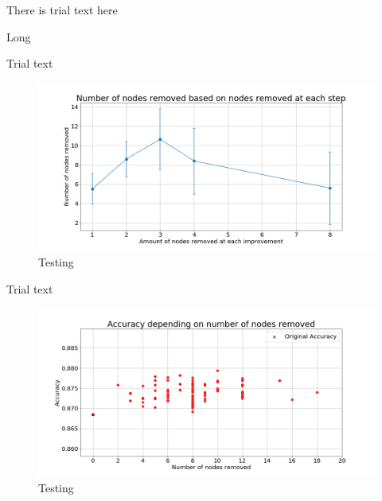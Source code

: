 \documentclass[UKenglish]{ifimaster}
\begin{document}
            There is trial text here

            \begin{table}[h!]
                \centering
                \resizebox{\textwidth}{!}{}
                \caption[Short]{Long}
                \label{tab:nr_rnd_rem_imp_fmnist}
            \end{table}

            Trial text

            \begin{figure}[h!]\centering
                \includegraphics[width=\textwidth]{Num_rem_vs_size_removed_fmnist.png}
                \caption[Short title]{Testing}
                \label{fig:num_rem_rn_imp_fmnist}
            \end{figure}

            Trial text

            \begin{figure}[h!]\centering
                \includegraphics[width=\textwidth]{Accuracy_vs_nodes_removed_fmnist.png}
                \caption[Short title]{Testing}
                \label{fig:acc_rn_imp_fmnist}
            \end{figure}
\end{document}
